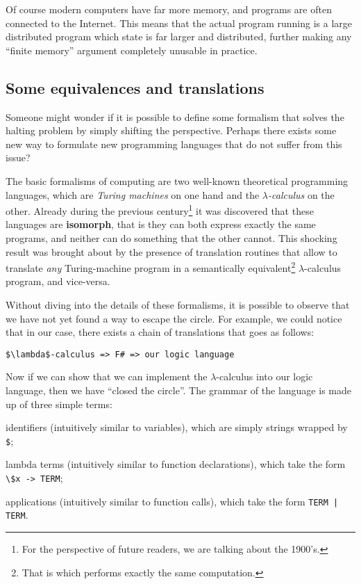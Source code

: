 Of course modern computers have far more memory, and programs are often connected to the Internet. This means that the actual program running is a large distributed program which state is far larger and distributed, further making any ``finite memory'' argument completely unusable in practice.

\subsection{Some equivalences and translations}
Someone might wonder if it is possible to define some formalism that solves the halting problem by simply shifting the perspective. Perhaps there exists some new way to formulate new programming languages that do not suffer from this issue?

The basic formalisms of computing are two well-known theoretical programming languages, which are \textit{Turing machines} on one hand and the $\lambda$\textit{-calculus} on the other. Already during the previous century\footnote{For the perspective of future readers, we are talking about the 1900's.} it was discovered that these languages are \textbf{isomorph}, that is they can both express exactly the same programs, and neither can do something that the other cannot. This shocking result was brought about by the presence of translation routines that allow to translate \textit{any} Turing-machine program in a semantically equivalent\footnote{That is which performs exactly the same computation.} $\lambda$-calculus program, and vice-versa.

Without diving into the details of these formalisms, it is possible to observe that we have not yet found a way to escape the circle. For example, we could notice that in our case, there exists a chain of translations that goes as follows:

\begin{lstlisting}[mathescape=true]
$\lambda$-calculus => F# => our logic language
\end{lstlisting}

Now if we can show that we can implement the $\lambda$-calculus into our logic language, then we have ``closed the circle''. The grammar of the language is made up of three simple terms: 
\begin{inparaenum}
\item identifiers (intuitively similar to variables), which are simply strings wrapped by \texttt{\$};
\item lambda terms (intuitively similar to function declarations), which take the form \texttt{\textbackslash \$x -> TERM};
\item applications (intuitively similar to function calls), which take the form \texttt{TERM | TERM}.
\end{inparaenum}

